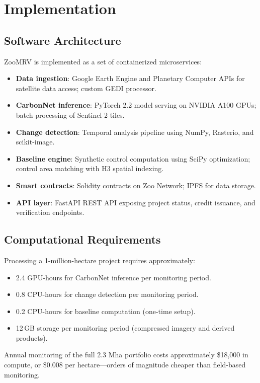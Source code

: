 \section{Implementation}

\label{sec:implementation}

\subsection{Software Architecture}

ZooMRV is implemented as a set of containerized microservices:

\begin{itemize}
  \item \textbf{Data ingestion}: Google Earth Engine and Planetary
    Computer APIs for satellite data access; custom GEDI processor.
  \item \textbf{CarbonNet inference}: PyTorch 2.2 model serving on
    NVIDIA A100 GPUs; batch processing of Sentinel-2 tiles.
  \item \textbf{Change detection}: Temporal analysis pipeline using
    NumPy, Rasterio, and scikit-image.
  \item \textbf{Baseline engine}: Synthetic control computation using
    SciPy optimization; control area matching with H3 spatial indexing.
  \item \textbf{Smart contracts}: Solidity contracts on Zoo Network;
    IPFS for data storage.
  \item \textbf{API layer}: FastAPI REST API exposing project status,
    credit issuance, and verification endpoints.
\end{itemize}

\subsection{Computational Requirements}

Processing a 1-million-hectare project requires approximately:
\begin{itemize}
  \item 2.4 GPU-hours for CarbonNet inference per monitoring period.
  \item 0.8 CPU-hours for change detection per monitoring period.
  \item 0.2 CPU-hours for baseline computation (one-time setup).
  \item 12\,GB storage per monitoring period (compressed imagery and
    derived products).
\end{itemize}

Annual monitoring of the full 2.3 Mha portfolio costs approximately
\$18{,}000 in compute, or \$0.008 per hectare---orders of magnitude
cheaper than field-based monitoring.


